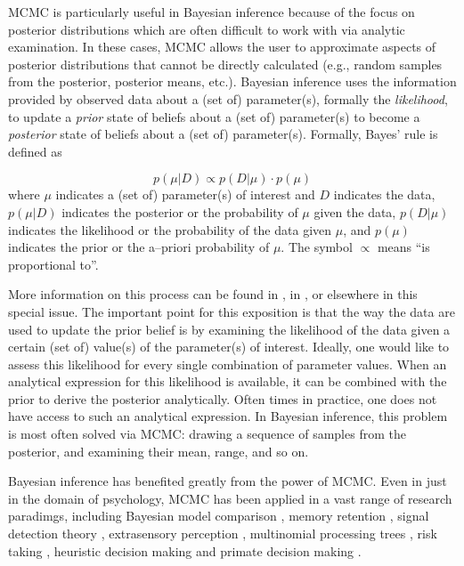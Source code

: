 MCMC is particularly useful in Bayesian inference because of the focus on posterior distributions which are often difficult to work with via analytic examination. In these cases, MCMC allows the user to approximate aspects of posterior distributions that cannot be directly calculated (e.g., random samples from the posterior, posterior means, etc.). Bayesian inference uses the information provided by observed data about a (set of) parameter(s), formally the \emph{likelihood}, to update a \emph{prior} state of beliefs about a (set of) parameter(s) to become a \emph{posterior} state of beliefs about a (set of) parameter(s). Formally, Bayes' rule is defined as

\begin{equation}
	p(\mu|D) \propto p(D|\mu) \cdot p(\mu)
	\label {BayesRule}
\end{equation}
where $\mu$ indicates a (set of) parameter(s) of interest and $D$ indicates the data, $p(\mu|D)$ indicates the posterior or the probability of $\mu$ given the data, $p(D|\mu)$ indicates the likelihood or the probability of the data given $\mu$, and $p(\mu)$ indicates the prior or the a--priori probability of $\mu$. The symbol $\propto$ means ``is proportional to''.

More information on this process can be found in , in , or elsewhere in this special issue. The important point for this exposition is that the way the data are used to update the prior belief is by examining the likelihood of the data given a certain (set of) value(s) of the parameter(s) of interest. Ideally, one would like to assess this likelihood for every single combination of parameter values. When an analytical expression for this likelihood is available, it can be combined with the prior to derive the posterior analytically. Often times in practice, one does not have access to such an analytical expression. In Bayesian inference, this problem is most often solved via MCMC: drawing a sequence of samples from the posterior, and examining their mean, range, and so on.

Bayesian inference has benefited greatly from the power of MCMC. Even in just in the domain of psychology, MCMC has been applied in a vast range of research paradimgs, including Bayesian model comparison \cite{ScheibehenneEtAl2013}, memory retention \cite{ShiffrinEtAl2008}, signal detection theory \cite{lee2008}, extrasensory perception \cite{WagenmakersEtAl2012Agenda}, multinomial processing trees \cite{MatzkeEtAl2015}, risk taking \cite{vanRavenzwaaijEtAlBART2011}, heuristic decision making \cite{vanRavenzwaaijEtAlCues2014} and primate decision making \cite{CasseyEtAl2014}. 

